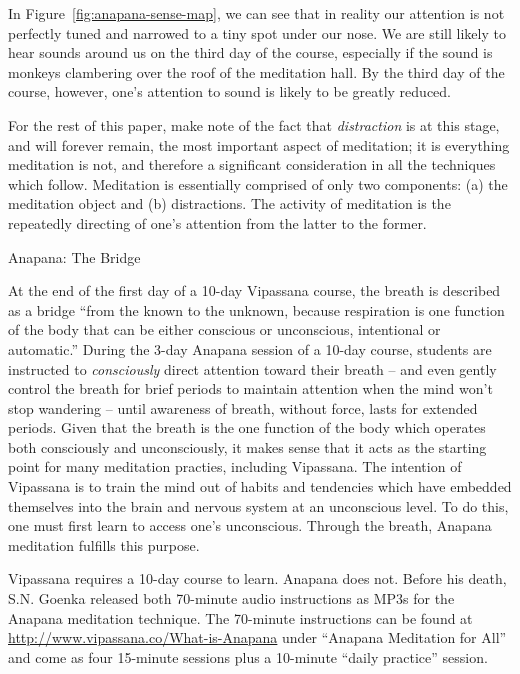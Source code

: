 \documentclass{article}
\begin{document}
In Figure~\ref{fig:anapana-sense-map}, we can see that in reality our attention is not perfectly tuned and narrowed to a tiny spot under our nose. We are still likely to hear sounds around us on the third day of the course, especially if the sound is monkeys clambering over the roof of the meditation hall. By the third day of the course, however, one's attention to sound is likely to be greatly reduced.

For the rest of this paper, make note of the fact that \textit{distraction} is at this stage, and will forever remain, the most important aspect of meditation; it is everything meditation is not, and therefore a significant consideration in all the techniques which follow. Meditation is essentially comprised of only two components: (a) the meditation object and (b) distractions. The activity of meditation is the repeatedly directing of one's attention from the latter to the former.

\pagebreak

\begin{center}
  \LARGE{Anapana: The Bridge}
\end{center}

At the end of the first day of a 10-day Vipassana course, the breath is described as a bridge ``from the known to the unknown, because respiration is one function of the body that can be either conscious or unconscious, intentional or automatic.'' During the 3-day Anapana session of a 10-day course, students are instructed to \textit{consciously} direct attention toward their breath -- and even gently control the breath for brief periods to maintain attention when the mind won't stop wandering -- until awareness of breath, without force, lasts for extended periods. Given that the breath is the one function of the body which operates both consciously and unconsciously, it makes sense that it acts as the starting point for many meditation practies, including Vipassana. The intention of Vipassana is to train the mind out of habits and tendencies which have embedded themselves into the brain and nervous system at an unconscious level. To do this, one must first learn to access one's unconscious. Through the breath, Anapana meditation fulfills this purpose.

Vipassana requires a 10-day course to learn. Anapana does not. Before his death, S.N. Goenka released both 70-minute audio instructions as MP3s for the Anapana meditation technique.\cite{anapana} The 70-minute instructions can be found at \url{http://www.vipassana.co/What-is-Anapana} under ``Anapana Meditation for All'' and come as four 15-minute sessions plus a 10-minute ``daily practice'' session.
\end{document}
